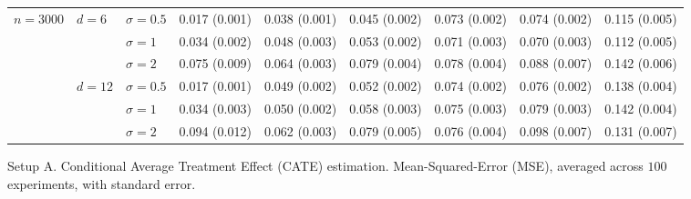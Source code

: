 \documentclass[11pt]{article} %
\theoremstyle{theorem}  %
\theoremstyle{plain}
\begin{document}
\begin{figure}[H]
\begin{tabular}{lllllllll}
\cline{1-9}
\cline{2-9}
\multirow{6}{*}{$n=3000$} & \multirow{3}{*}{$d=6$} & $\sigma=0.5$ &  0.017 (0.001) &  0.038 (0.001) &  0.045 (0.002) &  0.073 (0.002) &  0.074 (0.002) &  0.115 (0.005) \\
         &        & $\sigma=1$ &  0.034 (0.002) &  0.048 (0.003) &  0.053 (0.002) &  0.071 (0.003) &  0.070 (0.003) &  0.112 (0.005) \\
         &        & $\sigma=2$ &  0.075 (0.009) &  0.064 (0.003) &  0.079 (0.004) &  0.078 (0.004) &  0.088 (0.007) &  0.142 (0.006) \\
\cline{2-9}
         & \multirow{3}{*}{$d=12$} & $\sigma=0.5$ &  0.017 (0.001) &  0.049 (0.002) &  0.052 (0.002) &  0.074 (0.002) &  0.076 (0.002) &  0.138 (0.004) \\
         &        & $\sigma=1$ &  0.034 (0.003) &  0.050 (0.002) &  0.058 (0.003) &  0.075 (0.003) &  0.079 (0.003) &  0.142 (0.004) \\
         &        & $\sigma=2$ &  0.094 (0.012) &  0.062 (0.003) &  0.079 (0.005) &  0.076 (0.004) &  0.098 (0.007) &  0.131 (0.007) \\
\bottomrule
\end{tabular}

\caption{Setup A. Conditional Average Treatment Effect (CATE) estimation. Mean-Squared-Error (MSE), averaged across $100$ experiments, with standard error.}
\label{fig:setupA-cate}
\end{figure}
 
\end{document}
